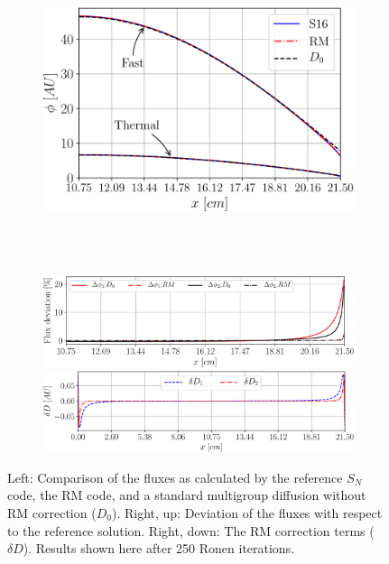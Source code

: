 \begin{figure}[!htbp]
	\centering
	\begin{subfigure}[b]{.44\linewidth}
		\includegraphics[width=\linewidth]{Sn_Diff_RM_Tomatis2011.pdf}
	\end{subfigure}
	~
	\begin{subfigure}[b]{.54\linewidth}
		~\includegraphics[width=0.97\linewidth]{flx_err_Tomatis2011_400_250.pdf}
		\includegraphics[width=\linewidth]{dD_Tomatis2011_400_250it.pdf}
	\end{subfigure}
	\caption{Left: Comparison of the fluxes as calculated by the reference $S_N$ code, the RM code, and a standard multigroup diffusion without RM correction ($D_0$). Right, up: Deviation of the fluxes with respect to the reference solution. Right, down: The RM correction terms ($\delta D$). Results shown here after 250 Ronen iterations.}
	\label{fig:fluxes}
\end{figure}


